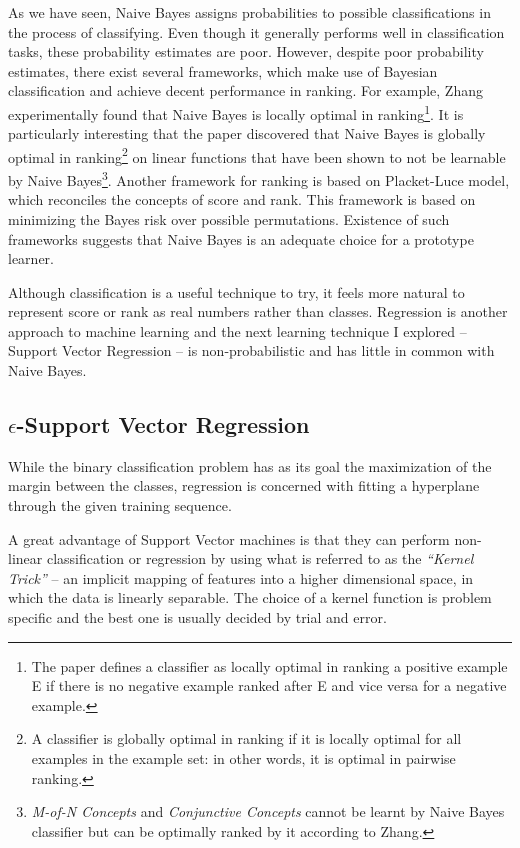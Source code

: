\documentclass[12pt,notitlepage,twoside]{scrbook}
\begin{document}
As we have seen, Naive Bayes assigns probabilities to possible classifications in the
process of classifying. Even though it generally performs well in classification tasks,
these probability estimates are poor\cite{domingos96}.  However, despite poor probability
estimates, there exist several frameworks, which make use of Bayesian classification and
achieve decent performance in ranking. For example, Zhang\cite{zhang04} experimentally
found that Naive Bayes is locally optimal in ranking\footnote{The paper defines a
	classifier as locally optimal in ranking a positive example E if there is no
negative example ranked after E and vice versa for a negative example.}.  It is
particularly interesting that the paper discovered that Naive Bayes is globally optimal in
ranking\footnote{A classifier is globally optimal in ranking if it is locally optimal for
all examples in the example set: in other words, it is optimal in pairwise ranking. } on
linear functions that have been shown to not be learnable by Naive
Bayes\footnote{\textit{M-of-N Concepts} and \textit{Conjunctive Concepts} cannot be learnt
by Naive Bayes classifier but can be optimally ranked by it according to
Zhang\cite{zhang04}.}.  Another framework for ranking\cite{bayesrank} is based on
Placket-Luce
model, which reconciles the concepts of score and rank. This framework is based on
minimizing the Bayes risk over possible permutations.  Existence of such frameworks
suggests that Naive Bayes is an adequate choice for a prototype learner.

Although classification is a useful technique to try, it feels more natural to
represent score or rank as real numbers rather than classes. Regression is
another approach to machine learning and the next learning technique I explored
-- Support Vector Regression -- is non-probabilistic and has little in common
with Naive Bayes.

\subsection{$\epsilon$-Support Vector Regression}
\label{prep:svm}
While the binary classification problem has as its goal the maximization of the
margin between the classes, regression is concerned with fitting a hyperplane
through the given training sequence. 

A great advantage of Support Vector machines is that they can perform
non-linear classification or regression by using what is referred to as the
\textit{``Kernel Trick''} -- an implicit mapping of features into a higher
dimensional space, in which the data is linearly separable. The choice of a
kernel function is problem specific and the best one is usually decided by
trial and error.
\end{document}
